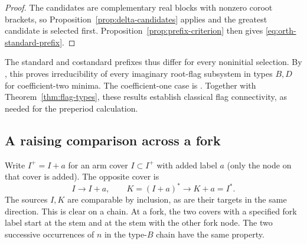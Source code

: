 \documentclass[11pt]{amsart}
\numberwithin{equation}{section}
\theoremstyle{definition}
\begin{document}
\begin{proof}
The candidates are complementary real blocks with nonzero coroot brackets, so Proposition~\ref{prop:delta-candidates} applies and the greatest candidate is selected first. Proposition~\ref{prop:prefix-criterion} then gives \eqref{eq:orth-standard-prefix}.
\end{proof}

The standard and costandard prefixes thus differ for every noninitial selection. By \cite[Proposition~4.28]{ETC}, this proves irreducibility of every imaginary root-flag subsystem in types $B,D$ for coefficient-two minima. The coefficient-one case is \cite[Lemma~4.31]{ETC}. Together with Theorem~\ref{thm:flag-types}, these results establish classical flag connectivity, as needed for the preperiod calculation.

\subsection{A raising comparison across a fork}\label{subsec:orthogonal-raising}
Write $I^+=I+a$ for an arm cover $I\subset I^+$ with added label $a$ (only the node on that cover is added). The opposite cover is
\begin{equation}\label{eq:opposite-covers}
 I\longrightarrow I+a,\qquad
 K=(I+a)^*\longrightarrow K+a=I^*.
\end{equation}
The sources $I,K$ are comparable by inclusion, as are their targets in the same direction. This is clear on a chain. At a fork, the two covers with a specified fork label start at the stem and at the stem with the other fork node. The two successive occurrences of $n$ in the type-$B$ chain have the same property.
\end{document}
